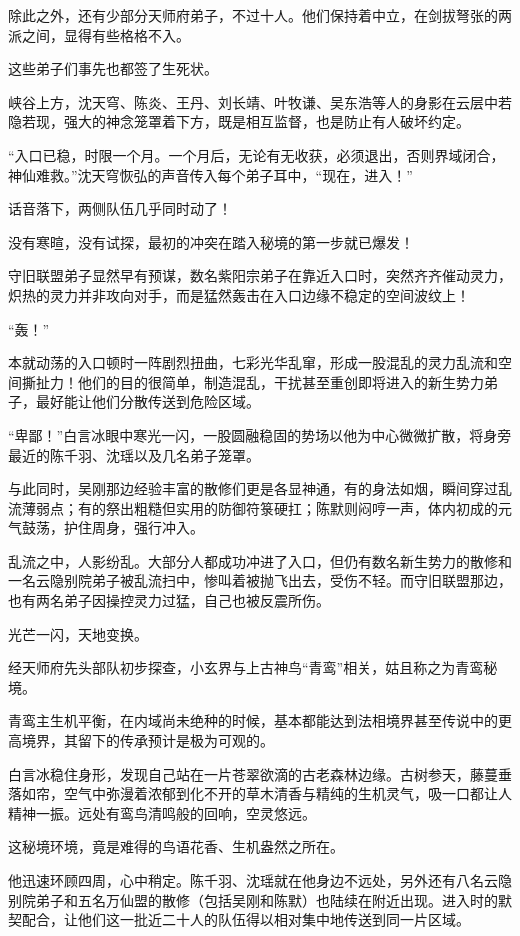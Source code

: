 除此之外，还有少部分天师府弟子，不过十人。他们保持着中立，在剑拔弩张的两派之间，显得有些格格不入。

这些弟子们事先也都签了生死状。

峡谷上方，沈天穹、陈炎、王丹、刘长靖、叶牧谦、吴东浩等人的身影在云层中若隐若现，强大的神念笼罩着下方，既是相互监督，也是防止有人破坏约定。

“入口已稳，时限一个月。一个月后，无论有无收获，必须退出，否则界域闭合，神仙难救。”沈天穹恢弘的声音传入每个弟子耳中，“现在，进入！”

话音落下，两侧队伍几乎同时动了！

没有寒暄，没有试探，最初的冲突在踏入秘境的第一步就已爆发！

守旧联盟弟子显然早有预谋，数名紫阳宗弟子在靠近入口时，突然齐齐催动灵力，炽热的灵力并非攻向对手，而是猛然轰击在入口边缘不稳定的空间波纹上！

“轰！”

本就动荡的入口顿时一阵剧烈扭曲，七彩光华乱窜，形成一股混乱的灵力乱流和空间撕扯力！他们的目的很简单，制造混乱，干扰甚至重创即将进入的新生势力弟子，最好能让他们分散传送到危险区域。

“卑鄙！”白言冰眼中寒光一闪，一股圆融稳固的势场以他为中心微微扩散，将身旁最近的陈千羽、沈瑶以及几名弟子笼罩。

与此同时，吴刚那边经验丰富的散修们更是各显神通，有的身法如烟，瞬间穿过乱流薄弱点；有的祭出粗糙但实用的防御符箓硬扛；陈默则闷哼一声，体内初成的元气鼓荡，护住周身，强行冲入。

乱流之中，人影纷乱。大部分人都成功冲进了入口，但仍有数名新生势力的散修和一名云隐别院弟子被乱流扫中，惨叫着被抛飞出去，受伤不轻。而守旧联盟那边，也有两名弟子因操控灵力过猛，自己也被反震所伤。

\vspace{2em}

光芒一闪，天地变换。

经天师府先头部队初步探查，小玄界与上古神鸟“青鸾”相关，姑且称之为青鸾秘境。

青鸾主生机平衡，在内域尚未绝种的时候，基本都能达到法相境界甚至传说中的更高境界，其留下的传承预计是极为可观的。

白言冰稳住身形，发现自己站在一片苍翠欲滴的古老森林边缘。古树参天，藤蔓垂落如帘，空气中弥漫着浓郁到化不开的草木清香与精纯的生机灵气，吸一口都让人精神一振。远处有鸾鸟清鸣般的回响，空灵悠远。

这秘境环境，竟是难得的鸟语花香、生机盎然之所在。

他迅速环顾四周，心中稍定。陈千羽、沈瑶就在他身边不远处，另外还有八名云隐别院弟子和五名万仙盟的散修（包括吴刚和陈默）也陆续在附近出现。进入时的默契配合，让他们这一批近二十人的队伍得以相对集中地传送到同一片区域。

